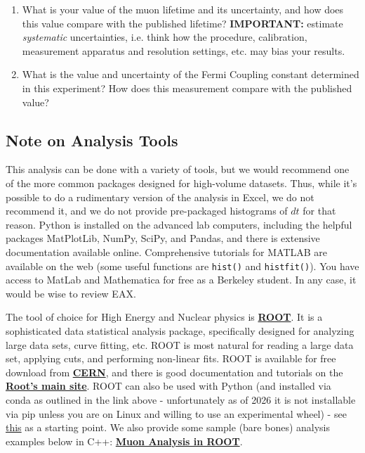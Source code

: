 \documentclass{../lab}
\begin{document}
\begin{enumerate}
\begin{itemize}
    \end{itemize}

    \item What is your value of the muon lifetime and its uncertainty, and how does this value compare with the published lifetime? \textbf{IMPORTANT:} estimate \emph{systematic} uncertainties, i.e. think how the procedure, calibration, measurement apparatus and resolution settings, etc. may bias your results.

    \item What is the value and uncertainty of the Fermi Coupling constant determined in this experiment? How does this measurement compare with the published value?

\end{enumerate}

\subsection{Note on Analysis Tools}

This analysis can be done with a variety of tools, but we would recommend one of the more common packages designed for high-volume datasets. Thus, while it's possible to do a rudimentary version of the analysis in Excel, we do not recommend it, and we do not provide pre-packaged histograms of $dt$ for that reason. Python is installed on the advanced lab computers, including the helpful packages MatPlotLib, NumPy, SciPy, and Pandas, and there is extensive documentation available online. Comprehensive tutorials for MATLAB are available on the web (some useful functions are \texttt{hist()} and \texttt{histfit()}). You have access to MatLab and Mathematica for free as a Berkeley student. In any case, it would be wise to review EAX.

The tool of choice for High Energy and Nuclear physics is \href{http://root.cern.ch}{\textbf{ROOT}}. It is a sophisticated data statistical analysis package, specifically designed for analyzing large data sets, curve fitting, etc. ROOT is most natural for reading a large data set, applying cuts, and performing non-linear fits. ROOT is available for free download from \href{https://root.cern.ch/drupal/content/downloading-root}{\textbf{CERN}}, and there is good documentation and tutorials on the \href{http://root.cern.ch}{\textbf{Root's main site}}. ROOT can also be used with Python (and installed via conda as outlined in the link above - unfortunately as of 2026 it is not installable via pip unless you are on Linux and willing to use an experimental wheel) - see \href{https://root.cern/manual/python/}{this} as a starting point. We also provide some sample (bare bones) analysis examples below in C++: \href{https://berkeley-physics111b.github.io/appendices/MUO-Analysis-in-ROOT/}{\textbf{Muon Analysis in ROOT}}.
\end{document}
